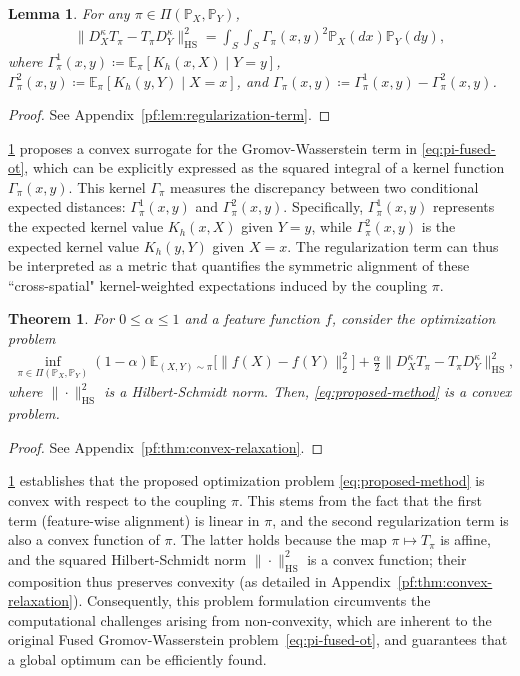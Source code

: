 \documentclass{article}
\newtheorem{theorem}{Theorem}
\newtheorem{lemma}{Lemma}
\begin{document}
\begin{lemma}
	\label{lem:regularization-term}
	For any $\pi \in \Pi(\mathbb{P}_X,\mathbb{P}_Y)$,
	\begin{align*}
		\| D_X^{\kappa}T_{\pi} - T_{\pi}D_Y^{\kappa} \|_{\mathrm{HS}}^2 = \int_S\int_S \Gamma_\pi(x,y)^2\mathbb{P}_X(dx)\mathbb{P}_Y(dy) ,
	\end{align*}
	where $\Gamma_\pi^1(x,y) \coloneqq \mathbb{E}_\pi[K_h(x,X) \mid Y = y]$, $\Gamma_\pi^2(x,y) \coloneqq \mathbb{E}_\pi[K_h(y,Y) \mid X = x]$, and $\Gamma_\pi(x,y) \coloneqq \Gamma_\pi^1(x,y) - \Gamma_\pi^2(x,y)$.
\end{lemma}
\begin{proof}
	See Appendix~\ref{pf:lem:regularization-term}.
\end{proof}
\cref{lem:regularization-term} proposes a convex surrogate for the Gromov-Wasserstein term in \eqref{eq:pi-fused-ot}, which can be explicitly expressed as the squared integral of a kernel function $\Gamma_\pi(x,y)$. This kernel $\Gamma_\pi$ measures the discrepancy between two conditional expected distances: $\Gamma_\pi^1(x,y)$ and $\Gamma_\pi^2(x,y)$. Specifically, $\Gamma_\pi^1(x,y)$ represents the expected kernel value $K_h(x,X)$ given $Y=y$, while $\Gamma_\pi^2(x,y)$ is the expected kernel value $K_h(y,Y)$ given $X=x$. The regularization term can thus be interpreted as a metric that quantifies the symmetric alignment of these ``cross-spatial" kernel-weighted expectations induced by the coupling $\pi$.

\begin{theorem}
	\label{thm:convex-relaxation}
	For $0 \leq \alpha \leq 1$ and a feature function $f$, consider the optimization problem 
	\begin{align}
		\label{eq:proposed-method}
		\inf_{\pi\in\Pi(\mathbb{P}_X,\mathbb{P}_Y)} (1-\alpha)\mathbb{E}_{(X,Y)\sim\pi}\big[\|f(X)-f(Y)\|_2^2\big] + \frac{\alpha}{2} \| D_X^{\kappa}T_\pi - T_\pi D_Y^{\kappa} \|_{\mathrm{HS}}^2 ,
	\end{align}
	where $\|\cdot\|_{\mathrm{HS}}^2$ is a Hilbert-Schmidt norm. Then, \eqref{eq:proposed-method} is a convex problem.
\end{theorem}
\begin{proof}
	See Appendix~\ref{pf:thm:convex-relaxation}.
\end{proof}
\cref{thm:convex-relaxation} establishes that the proposed optimization problem \eqref{eq:proposed-method} is convex with respect to the coupling $\pi$. This stems from the fact that the first term (feature-wise alignment) is linear in $\pi$, and the second regularization term is also a convex function of $\pi$. The latter holds because the map $\pi \mapsto T_\pi$ is affine, and the squared Hilbert-Schmidt norm $\|\cdot\|_{\mathrm{HS}}^2$ is a convex function; their composition thus preserves convexity (as detailed in Appendix~\ref{pf:thm:convex-relaxation}). Consequently, this problem formulation circumvents the computational challenges arising from non-convexity, which are inherent to the original Fused Gromov-Wasserstein problem~\eqref{eq:pi-fused-ot}, and guarantees that a global optimum can be efficiently found.
\end{document}
